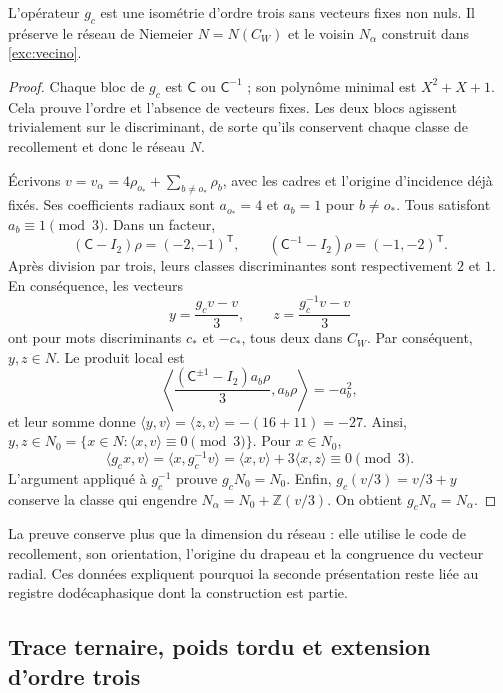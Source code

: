 \begin{proposition}
\label{km:estabilidad-vecino}
L'opérateur \(g_c\) est une isométrie d'ordre trois sans vecteurs fixes non nuls. Il préserve le réseau de Niemeier \(N=N(C_W)\) et le voisin \(N_\alpha\) construit dans \eqref{exc:vecino}.
\end{proposition}
\begin{proof}
Chaque bloc de \(g_c\) est \(\mathsf C\) ou \(\mathsf C^{-1}\) ;
son polynôme minimal est \(X^2+X+1\). Cela prouve l'ordre et
l'absence de vecteurs fixes. Les deux blocs agissent trivialement sur le
discriminant, de sorte qu'ils conservent chaque classe de recollement et donc
le réseau \(N\).

Écrivons \(v=v_\alpha=4\rho_{o_*}+\sum_{b\ne o_*}\rho_b\),
avec les cadres et l'origine d'incidence déjà fixés. Ses coefficients
radiaux sont \(a_{o_*}=4\) et \(a_b=1\) pour \(b\ne o_*\).
Tous satisfont \(a_b\equiv1\pmod3\). Dans un facteur,
\[
 (\mathsf C-I_2)\rho=(-2,-1)^{\mathsf T},\qquad
 (\mathsf C^{-1}-I_2)\rho=(-1,-2)^{\mathsf T}.
\]
Après division par trois, leurs classes discriminantes sont respectivement \(2\) et \(1\). En conséquence, les vecteurs
\begin{equation}
 y=\frac{g_cv-v}{3},\qquad z=\frac{g_c^{-1}v-v}{3}
 \label{km:desplazamientos}
\end{equation}
ont pour mots discriminants \(c_*\) et \(-c_*\), tous deux dans
\(C_W\). Par conséquent, \(y,z\in N\). Le produit local est
\[
 \left\langle
 \frac{(\mathsf C^{\pm1}-I_2)a_b\rho}{3},a_b\rho
 \right\rangle=-a_b^2,
\]
et leur somme donne \(\langle y,v\rangle=\langle z,v\rangle=-(16+11)=-27\). Ainsi, \(y,z\in N_0=\{x\in N:\langle x,v\rangle\equiv0\pmod3\}\). Pour \(x\in N_0\),
\[
 \langle g_cx,v\rangle
 =\langle x,g_c^{-1}v\rangle
 =\langle x,v\rangle+3\langle x,z\rangle\equiv0\pmod3.
\]
L'argument appliqué à \(g_c^{-1}\) prouve \(g_cN_0=N_0\).
Enfin, \(g_c(v/3)=v/3+y\) conserve la classe qui engendre
\(N_\alpha=N_0+\mathbb Z(v/3)\). On obtient
\(g_cN_\alpha=N_\alpha\).
\end{proof}

La preuve conserve plus que la dimension du réseau : elle utilise le code de recollement, son orientation, l'origine du drapeau et la congruence du vecteur radial. Ces données expliquent pourquoi la seconde présentation reste liée au registre dodécaphasique dont la construction est partie.

\subsection{Trace ternaire, poids tordu et extension d'ordre trois}
\label{km:orbifold-tres}


